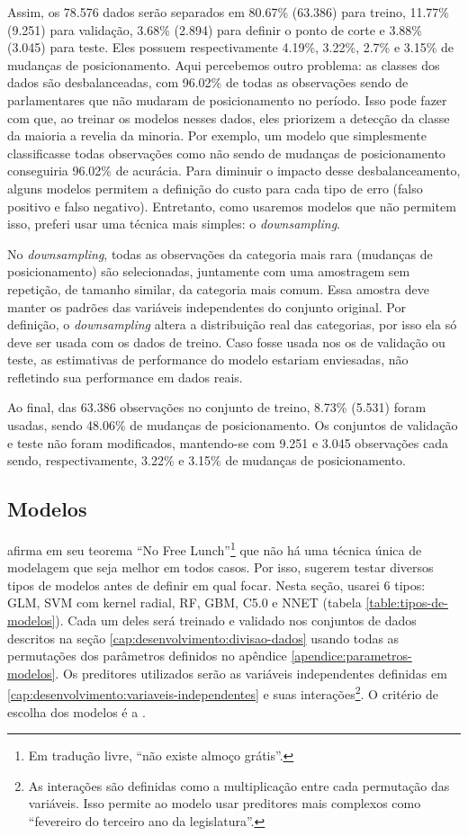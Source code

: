 \documentclass[a4paper,titlepage]{ppgi}\usepackage[]{graphicx}\usepackage[]{color}
\begin{document}
Assim, os 78.576 dados serão separados em
80.67\%
(63.386) para treino,
11.77\%
(9.251) para validação,
3.68\%
(2.894) para definir o ponto de corte e
3.88\% (3.045) para
teste. Eles possuem respectivamente
4.19\%,
3.22\%,
2.7\% e
3.15\% de mudanças de posicionamento.
Aqui percebemos outro problema: as classes dos dados são desbalanceadas, com
96.02\% de todas as observações sendo de
parlamentares que não mudaram de posicionamento no período. Isso pode fazer com
que, ao treinar os modelos nesses dados, eles priorizem a detecção da classe da
maioria a revelia da minoria. Por exemplo, um modelo que simplesmente
classificasse todas observações como não sendo de mudanças de posicionamento
conseguiria 96.02\% de acurácia.  Para
diminuir o impacto desse desbalanceamento, alguns modelos permitem a definição
do custo para cada tipo de erro (falso positivo e falso negativo). Entretanto,
como usaremos modelos que não permitem isso, preferi usar uma técnica mais
simples: o \emph{downsampling}.

No \emph{downsampling}, todas as observações da categoria mais rara (mudanças de
posicionamento) são selecionadas, juntamente com uma amostragem sem repetição,
de tamanho similar, da categoria mais comum. Essa amostra deve manter os padrões
das variáveis independentes do conjunto original. Por definição, o
\emph{downsampling} altera a distribuição real das categorias, por isso ela só
deve ser usada com os dados de treino. Caso fosse usada nos os de validação ou
teste, as estimativas de performance do modelo estariam enviesadas, não
refletindo sua performance em dados reais.

Ao final, das 63.386 observações no conjunto de
treino, 8.73\% (5.531) foram usadas,
sendo 48.06\% de mudanças
de posicionamento. Os conjuntos de validação e teste não foram modificados,
mantendo-se com 9.251 e 3.045 observações
cada sendo, respectivamente,
3.22\% e
3.15\% de mudanças de posicionamento.

\subsection{Modelos}
\label{cap:miolo:modelos}



 afirma em seu teorema ``No Free Lunch''\footnote{Em
tradução livre, ``não existe almoço grátis''.} que não há uma técnica única de
modelagem que seja melhor em todos casos. Por isso, 
sugerem testar diversos tipos de modelos antes de definir em qual focar. Nesta
seção, usarei 6 tipos: \gls{GLM}, SVM com kernel
radial, \gls{RF}, \gls{GBM}, C5.0 e \gls{NNET} (tabela
\ref{table:tipos-de-modelos}). Cada um deles será treinado e validado nos
conjuntos de dados descritos na seção \ref{cap:desenvolvimento:divisao-dados} usando todas
as permutações dos parâmetros definidos no apêndice
\ref{apendice:parametros-modelos}. Os preditores utilizados serão as variáveis
independentes definidas em \ref{cap:desenvolvimento:variaveis-independentes} e suas
interações\footnote{As interações são definidas como a multiplicação entre cada
permutação das variáveis. Isso permite ao modelo usar preditores mais complexos
como ``fevereiro do terceiro ano da legislatura''.}. O critério de escolha dos
modelos é a .
\end{document}
